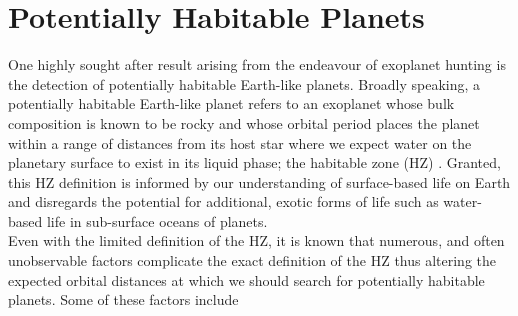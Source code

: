 \section{Potentially Habitable Planets} \label{sect:HZ}
One highly sought after result arising from the endeavour of exoplanet hunting 
is the detection of potentially habitable Earth-like planets. 
Broadly speaking, a potentially habitable Earth-like planet refers to 
an exoplanet whose bulk composition is known to be rocky and whose 
orbital period places the planet within a range of distances from its host star 
where we expect water on the planetary surface to exist in its liquid phase; 
the habitable zone (HZ) \parencite{dole64, hart79}. Granted, this HZ 
definition is 
informed by our understanding of surface-based life on Earth and disregards 
the potential for additional, exotic forms of life such as water-based life 
in sub-surface oceans of planets. \\

Even with the limited definition of the 
HZ, it is known that numerous, and often unobservable factors complicate the 
exact definition of the HZ thus altering the expected orbital 
distances at which we should search for potentially habitable planets. 
Some of these factors include 

